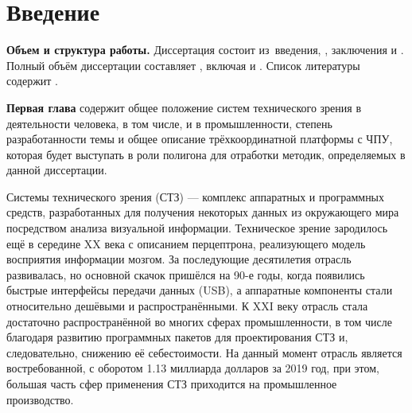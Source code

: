 \chapter*{Введение}                         %

\newcommand{\actuality}{}
\newcommand{\progress}{}
\newcommand{\aim}{{\textbf\aimTXT}}
\newcommand{\tasks}{\textbf{\tasksTXT}}
\newcommand{\novelty}{\textbf{\noveltyTXT}}
\newcommand{\influence}{\textbf{\influenceTXT}}
\newcommand{\methods}{\textbf{\methodsTXT}}
\newcommand{\defpositions}{\textbf{\defpositionsTXT}}
\newcommand{\reliability}{\textbf{\reliabilityTXT}}
\newcommand{\probation}{\textbf{\probationTXT}}
\newcommand{\contribution}{\textbf{\contributionTXT}}
\newcommand{\publications}{\textbf{\publicationsTXT}}


\textbf{Объем и структура работы.} Диссертация состоит из~введения,
,
заключения и
.
%
Полный объём диссертации составляет
, включая
 и
.
Список литературы содержит
.

\textbf{Первая глава} содержит общее положение систем технического зрения в деятельности человека, в том числе, и в промышленности, степень разработанности темы и общее описание трёхкоординатной платформы с ЧПУ, которая будет выступать в роли полигона для отработки методик, определяемых в данной диссертации.

Системы технического зрения (СТЗ) --- комплекс аппаратных и программных средств, разработанных для получения некоторых данных из окружающего мира посредством анализа визуальной информации. Техническое зрение зародилось ещё в середине XX века с описанием перцептрона, реализующего модель восприятия информации мозгом. За последующие десятилетия отрасль развивалась, но основной скачок пришёлся на 90-е годы, когда появились быстрые интерфейсы передачи данных (USB), а аппаратные компоненты стали относительно дешёвыми и распространёнными. К XXI веку отрасль стала достаточно распространённой во многих сферах промышленности, в том числе благодаря развитию программных пакетов для проектирования СТЗ и, следовательно, снижению её себестоимости. На данный момент отрасль является востребованной, с оборотом 1.13 миллиарда долларов за 2019 год, при этом, большая часть сфер применения СТЗ приходится на промышленное производство.

